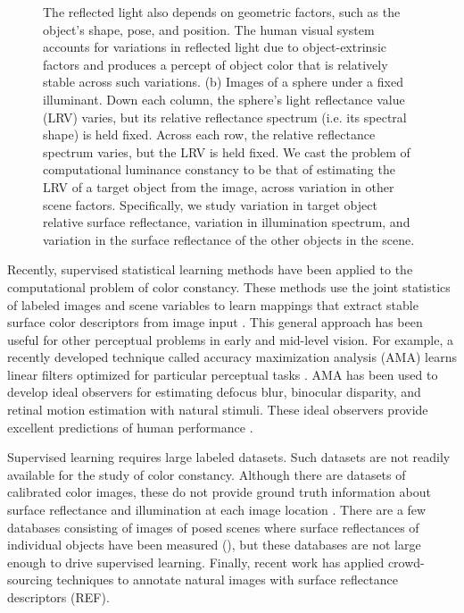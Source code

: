 \documentclass{jov}
\begin{document}
\begin{figure}
{The reflected light also depends on geometric factors, such as the object's shape, pose, and position. 
The human visual system accounts for variations in reflected light due to object-extrinsic factors and produces a percept of object color that is relatively stable across such variations. 
(b) Images of a sphere under a fixed illuminant.  
Down each column, the sphere's light reflectance value (LRV) varies, but its relative reflectance spectrum (i.e. its spectral shape) is held fixed.
Across each row, the relative reflectance spectrum varies, but the LRV is held fixed.
We cast the problem of computational luminance constancy to be that of estimating the LRV of a target object from the image, across variation in other scene factors. 
Specifically, we study variation in target object relative surface reflectance, variation in illumination spectrum, and variation in the surface reflectance of the other objects in the scene.}
 \end{figure}

Recently, supervised statistical learning methods have been applied to the computational problem of color constancy.
These methods use the joint statistics of labeled images and scene variables to learn mappings that extract stable surface color descriptors from image input \cite{barron2015convolutional}.
This general approach has been useful for other perceptual problems in early and mid-level vision.
For example, a recently developed technique called accuracy maximization analysis (AMA) learns linear filters optimized for particular perceptual tasks \cite{geisler2009optimal,burge2017accuracy,jaini2017linking}. AMA has been used to develop ideal observers for estimating defocus blur, binocular disparity, and retinal motion estimation with natural stimuli. These ideal observers provide excellent predictions of human performance \cite{burge2011optimal, burge2012optimal, burge2014optimal, burge2015optimal}.

Supervised learning requires large labeled datasets.  Such datasets are not readily available for the study of color constancy. Although there are datasets of calibrated color images, these do not provide ground truth information about surface reflectance and illumination at each image location \cite{ChakrabartiHyperspectral,NascimentoFoster2016,ParragaHyperspectralData,TkacikUpennHypersepctralData,skauli2013collection,olmos2004biologically}. There are a few databases consisting of images of posed scenes where surface reflectances of individual objects have been measured (), but these databases are not large enough to drive supervised learning. Finally, recent work has applied crowd-sourcing techniques to annotate natural images with surface reflectance descriptors (REF).
 
\end{document}
